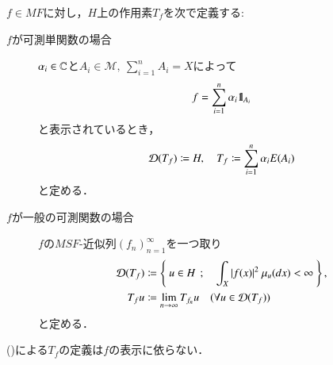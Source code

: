 	\begin{screen}
		\begin{dfn}[可測関数で導入する作用素]
			$f \in MF$に対し，$H$上の作用素$T_f$を次で定義する:
			\begin{description}
				\item[$f$が可測単関数の場合]
					$\alpha_i \in \mathbb{C}$と$A_i \in \mathcal{M},\ \sum_{i=1}^{n} A_i = X$によって
					\begin{align}
						f = \sum_{i=1}^{n} \alpha_i \mbox{1}\hspace{-0.25em}\mbox{l}_{A_i}
					\end{align}
					と表示されているとき，
					\begin{align}
						\Dom{T_f} \coloneqq H,\quad T_f \coloneqq \sum_{i=1}^{n} \alpha_i E(A_i)
						\label{eq:dfn_operator_introduced_by_measurable_functions}
					\end{align}
					と定める．
				
				\item[$f$が一般の可測関数の場合]
					$f$の$MSF$-近似列$(f_n)_{n=1}^{\infty}$を一つ取り
					\begin{align}
						\Dom{T_f} &\coloneqq \Set{u \in H}{\int_X |f(x)|^2\ \mu_u(dx) < \infty}, \label{eq:dfn_operator_introduced_by_measurable_functions_3} \\
						T_f u &\coloneqq \lim_{n \to \infty} T_{f_n} u \quad (\forall u \in \Dom{T_f} )
						\label{eq:dfn_operator_introduced_by_measurable_functions_2}
					\end{align}
					と定める．
			\end{description}
			\label{dfn:operator_introduced_by_measurable_functions}
		\end{dfn}
	\end{screen}
	
	\begin{screen}
		\begin{lem}
			()による$T_f$の定義は$f$の表示に依らない．
		\end{lem}	
	\end{screen}
	
